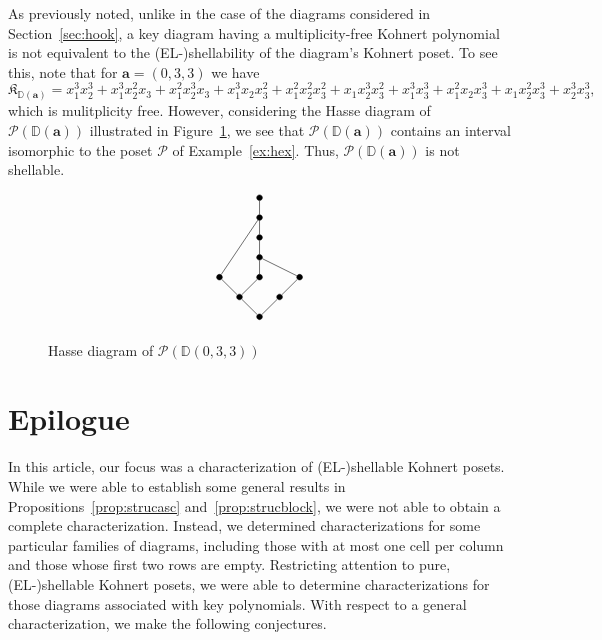 \documentclass[letterpaper,10pt]{article}
\begin{document}
As previously noted, unlike in the case of the diagrams considered in Section~\ref{sec:hook}, a key diagram having a multiplicity-free Kohnert polynomial is not equivalent to the (EL-)shellability of the diagram's Kohnert poset. To see this, note that for $\mathbf{a}=(0,3,3)$ we have $$\mathfrak{K}_{\mathbb{D}(\mathbf{a})}=x_1^3x_2^3+x_1^3x_2^2x_3+x_1^2x_2^3x_3+x_1^3x_2x_3^2+x_1^2x_2^2x_3^2+x_1x_2^3x_3^2+x_1^3x_3^3+x_1^2x_2x_3^3+x_1x_2^2x_3^3+x_2^3x_3^3,$$ which is mulitplicity free. However, considering the Hasse diagram of $\mathcal{P}(\mathbb{D}(\mathbf{a}))$ illustrated in Figure~\ref{fig:keymf}, we see that $\mathcal{P}(\mathbb{D}(\mathbf{a}))$ contains an interval isomorphic to the poset $\mathcal{P}$ of Example~\ref{ex:hex}. Thus, $\mathcal{P}(\mathbb{D}(\mathbf{a}))$ is not shellable.

\begin{figure}[H]
    \centering
    $$\begin{tikzpicture}
	\node (1) at (0, 0) [circle, draw = black, fill = black, inner sep = 0.5mm]{};
	\node (2) at (-0.5, 0.5)[circle, draw = black, fill = black, inner sep = 0.5mm] {};
    \node (3) at (0.5, 0.5) [circle, draw = black, fill = black, inner sep = 0.5mm]{};
    \node (4) at (-1, 1) [circle, draw = black, fill = black, inner sep = 0.5mm]{};
    \node (5) at (0, 1) [circle, draw = black, fill = black, inner sep = 0.5mm]{};
    \node (6) at (1, 1) [circle, draw = black, fill = black, inner sep = 0.5mm]{};
    \node (7) at (0, 1.5) [circle, draw = black, fill = black, inner sep = 0.5mm]{};
    \node (8) at (0, 2) [circle, draw = black, fill = black, inner sep = 0.5mm]{};
    \node (9) at (0, 2.5) [circle, draw = black, fill = black, inner sep = 0.5mm]{};
    \node (10) at (0, 3) [circle, draw = black, fill = black, inner sep = 0.5mm]{};
    \draw (1)--(3)--(6)--(7)--(8)--(9)--(4)--(2)--(5)--(7);
    \draw (1)--(2);
    \draw (9)--(10);
\end{tikzpicture}$$
    \caption{Hasse diagram of $\mathcal{P}(\mathbb{D}(0,3,3))$}
    \label{fig:keymf}
\end{figure}

\section{Epilogue}\label{sec:ep}

In this article, our focus was a characterization of (EL-)shellable Kohnert posets. While we were able to establish some general results in Propositions~\ref{prop:strucasc} and~\ref{prop:strucblock}, we were not able to obtain a complete characterization. Instead, we determined characterizations for some particular families of diagrams, including those with at most one cell per column and those whose first two rows are empty. Restricting attention to pure, (EL-)shellable Kohnert posets, we were able to determine characterizations for those diagrams associated with key polynomials. With respect to a general characterization, we make the following conjectures.
\end{document}
